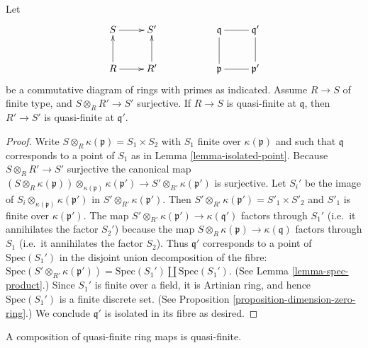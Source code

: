 \begin{lemma}
\label{lemma-four-rings}
Let
$$
\xymatrix{
S \ar[r] & S' & &
\mathfrak q \ar@{-}[r] & \mathfrak q' \\
R \ar[u] \ar[r] &  R' \ar[u] & &
\mathfrak p \ar@{-}[r] \ar@{-}[u] & \mathfrak p' \ar@{-}[u]
}
$$
be a commutative diagram of rings with primes as indicated.
Assume $R \to S$ of finite type, and $S \otimes_R R' \to S'$ surjective.
If $R \to S$ is quasi-finite at $\mathfrak q$, then
$R' \to S'$ is quasi-finite at $\mathfrak q'$.
\end{lemma}

\begin{proof}
Write $S \otimes_R \kappa(\mathfrak p) = S_1 \times S_2$
with $S_1$ finite over $\kappa(\mathfrak p)$ and such that
$\mathfrak q$ corresponds to a point of $S_1$ as in
Lemma \ref{lemma-isolated-point}.
Because $S \otimes_R R' \to S'$ surjective the canonical map
$(S \otimes_R \kappa(\mathfrak p)) \otimes_{\kappa(\mathfrak p)}
\kappa(\mathfrak p') \to S' \otimes_{R'} \kappa(\mathfrak p')$
is surjective. Let $S_i'$ be the image of $S_i \otimes_{\kappa(\mathfrak p)}
\kappa(\mathfrak p')$ in $S' \otimes_{R'} \kappa(\mathfrak p')$.
Then $S' \otimes_{R'} \kappa(\mathfrak p') =S'_1 \times
S'_2$ and $S'_1$ is finite over $\kappa(\mathfrak p')$.
The map $S' \otimes_{R'} \kappa(\mathfrak p') \to
\kappa(\mathfrak q')$ factors through $S_1'$
(i.e.\ it annihilates the factor $S_2'$)
because the map $S\otimes_R \kappa(\mathfrak p) \to
\kappa(\mathfrak q)$ factors through $S_1$
(i.e.\ it annihilates the factor $S_2$). Thus
$\mathfrak q'$ corresponds to a point of
$\text{Spec}(S_1')$ in the disjoint union decomposition
of the fibre: $\text{Spec}(S' \otimes_{R'} \kappa(\mathfrak p'))
= \text{Spec}(S_1') \amalg \text{Spec}(S_1')$. (See
Lemma \ref{lemma-spec-product}.)
Since $S_1'$ is finite over a field, it is Artinian ring,
and hence $\text{Spec}(S_1')$ is a finite discrete set.
(See Proposition \ref{proposition-dimension-zero-ring}.)
We conclude $\mathfrak q'$ is isolated in its fibre as
desired.
\end{proof}

\begin{lemma}
\label{lemma-quasi-finite-composition}
A composition of quasi-finite ring maps is quasi-finite.
\end{lemma}

